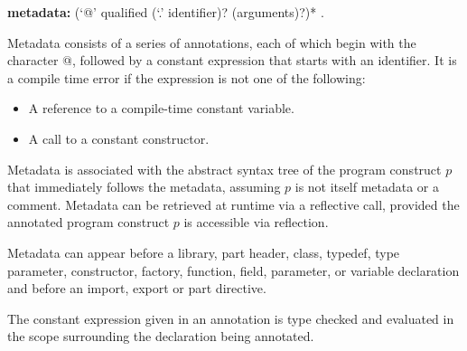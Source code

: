 \documentclass{article}
\begin{document}
\begin{grammar}
{\bf metadata:}
      (`@' qualified ({\escapegrammar `.'} identifier)? (arguments)?)*
    .
\end{grammar}

\LMHash{}
Metadata consists of a series of annotations, each of which begin with the character @, followed by  a constant expression that starts with an identifier. It is a compile time error if the expression is not one of the following:
\begin{itemize}
\item A reference to a compile-time constant variable.
\item A call to a constant constructor.
\end{itemize}

\LMHash{}
Metadata is associated with the abstract syntax tree of the program construct $p$ that immediately follows the metadata, assuming $p$ is not itself metadata or a comment. Metadata can be retrieved at runtime via a reflective call, provided the annotated program construct $p$ is accessible via reflection.




\LMHash{}
Metadata can appear before a library, part header, class, typedef, type parameter, constructor, factory, function, field, parameter, or variable declaration and before an import, export or part directive.

\LMHash{}
The constant expression given in an annotation  is type checked and evaluated in the scope surrounding the declaration being annotated.  
\end{document}
